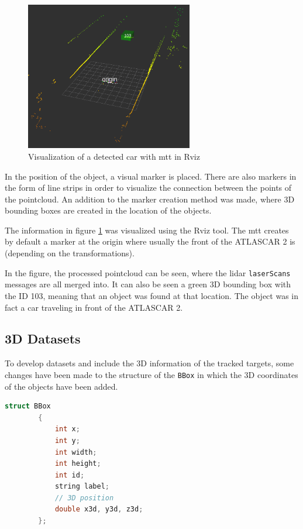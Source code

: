 \begin{figure}[htp]
	
	\centering
	\includegraphics[width=0.65\textwidth]{caplabel/imgs/rviz1.png}
	
	\caption{Visualization of a detected car with \gls{mtt} in Rviz}
	\label{fig:rviz1}
	
\end{figure}

In the position of the object, a visual marker is placed. There are also markers in the form of line strips in order to visualize the connection between the points of the pointcloud. An addition to the marker creation method was made, where 3D bounding boxes are created in the location of the objects.

The information in figure \ref{fig:rviz1} was visualized using the Rviz tool. The \gls{mtt} creates by default a marker at the origin where usually the front of the ATLASCAR 2 is (depending on the transformations). 

In the figure, the processed pointcloud can be seen, where the \gls{lidar} \texttt{laserScans} messages are all merged into. It can also be seen a green 3D bounding box with the ID 103, meaning that an object was found at that location. The object was in fact a car traveling in front of the ATLASCAR 2. 

\subsection{3D Datasets}

To develop datasets and include the 3D information of the tracked targets, some changes have been made to the structure of the \texttt{BBox} in which the 3D coordinates of the objects have been added.

	\begin{center}
		\begin{lstlisting}[label={lst:bbox3d}, caption={BBox struct definition with 3D capabilities},language=c++]
		struct BBox
		{
			int x;
			int y;
			int width;
			int height;
			int id;
			string label;
			// 3D position
			double x3d, y3d, z3d;
		};		\end{lstlisting}
	\end{center}

